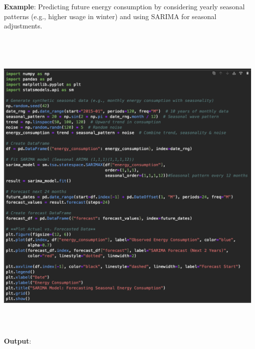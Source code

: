 \documentclass{article}
\begin{document}
\begin{itemize}
\begin{itemize}
\textbf{Example}: Predicting future energy consumption by considering yearly seasonal patterns (e.g., higher usage in winter) and using SARIMA for seasonal adjustments.

\includegraphics[width=14cm,height=16cm]{SARIMA.png}
\newpage
\textbf{Output}:


\end{itemize}
\end{itemize}
\end{document}
